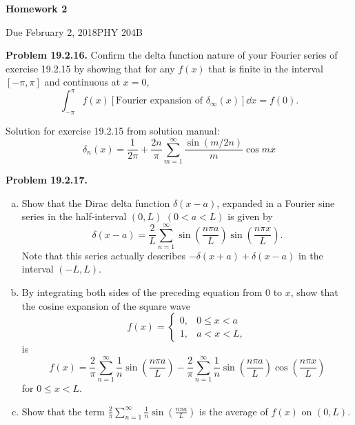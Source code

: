 \documentclass{article}
\newcommand{\Title}     {Homework 2}
\newcommand{\DueDate}   {February 2, 2018}
\newcommand{\Course}    {PHY 204B}
\begin{document}
{\huge\bf\Title}

Due \DueDate \hfill \Course


\hrulefill

\textbf{Problem 19.2.16.} Confirm the delta function nature of your Fourier series of exercise 19.2.15 by showing that for any $f(x)$ that is finite in the interval $[-\pi, \pi]$ and continuous at $x=0$,
\begin{equation*}
    \int_{-\pi}^\pi f(x) \left[\text{Fourier expansion of $\delta_\infty (x)$}\right] \dd x = f(0).
\end{equation*}

Solution for exercise 19.2.15 from solution manual:
\begin{equation*}
    \delta_n(x) = \frac{1}{2\pi} + \frac{2n}{\pi}\sum_{m=1}^\infty \frac{\sin(m/2n)}{m}\cos mx
\end{equation*}

\hrulefill

\textbf{Problem 19.2.17.}
\begin{enumerate}[(a)]
    \item Show that the Dirac delta function $\delta(x-a)$, expanded in a Fourier sine series in the half-interval $(0,L)\,\,(0<a<L)$ is given by
    \begin{equation*}
    \delta(x-a) = \frac{2}{L}\sum_{n=1}^\infty \sin\left(\frac{n\pi a}{L}\right)\sin\left(\frac{n\pi x}{L}\right).
    \end{equation*}
    Note that this series actually describes $-\delta(x+a) + \delta(x-a)$ in the interval $(-L,L)$.

    \item By integrating both sides of the preceding equation from 0 to $x$, show that the cosine expansion of the square wave
    \begin{equation*}
    f(x) = 
    \begin{cases} 
        0, &0\leq x < a \\
        1, &a<x<L,
    \end{cases}
    \end{equation*}
    is
    \begin{equation*}
    f(x) = \frac{2}{\pi}\sum_{n=1}^\infty \frac{1}{n}\sin\left(\frac{n\pi a}{L}\right) - \frac{2}{\pi}\sum_{n=1}^\infty \frac{1}{n}\sin\left(\frac{n\pi a}{L}\right)\cos\left(\frac{n\pi x}{L}\right)
    \end{equation*}
    for $0\leq x < L$.

    \item Show that the term $\displaystyle{\frac{2}{\pi}\sum_{n=1}^\infty \frac{1}{n}\sin\left(\frac{n\pi a}{L}\right)}$ is the average of $f(x)$ on $(0,L)$.
\end{enumerate}
\hrulefill
 
\end{document}

